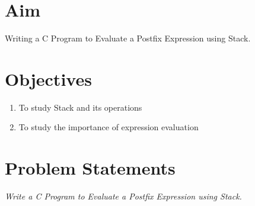 \documentclass[11pt]{article}
\begin{document}
\tableofcontents
\thispagestyle{empty}
\clearpage
\setcounter{page}{1}

\section{Aim}
Writing a C Program to Evaluate a Postfix Expression using Stack.
\section{Objectives}
\begin{enumerate}
	\item To study Stack and its operations
	\item To study the importance of expression evaluation
\end{enumerate}

\section{Problem Statements}
\textit{Write a C Program to Evaluate a Postfix Expression using Stack. }
\end{document}
